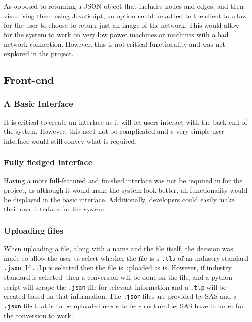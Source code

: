 \documentclass[../dissertation.tex]{subfiles}
\begin{document}
As opposed to returning a JSON object that includes nodes and edges, and then visualising them using JavaScript, an option could be added to the client to allow for the user to choose to return just an image of the network. This would allow for the system to work on very low power machines or machines with a bad network connection. However, this is not critical functionality and was not explored in the project.

\subsection{Front-end}

\subsubsection{A Basic Interface}

It is critical to create an interface as it will let users interact with the back-end of the system. However, this need not be complicated and a very simple user interface would still convey what is required.

\subsubsection{Fully fledged interface}

Having a more full-featured and finished interface was not be required in for the project, as although it would make the system look better, all functionality would be displayed in the basic interface. Additionally, developers could easily make their own interface for the system.

\subsubsection{Uploading files}

When uploading a file, along with a name and the file itself, the decision was made to allow the user to select whether the file is a \texttt{.tlp} of an industry standard \texttt{.json}. If \texttt{.tlp} is selected then the file is uploaded as is. However, if industry standard is selected, then a conversion will be done on the file, and a python script will scrape the \texttt{.json} file for relevant information and a \texttt{.tlp} will be created based on that information. The \texttt{.json} files are provided by SAS and a \texttt{.json} file that is to be uploaded needs to be structured as SAS have in order for the conversion to work. 
\end{document}
